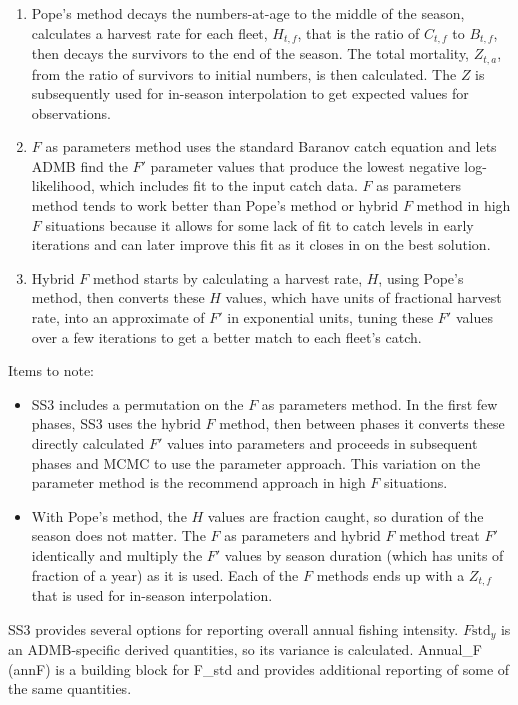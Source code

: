 \begin{enumerate}
	\item Pope's method decays the numbers-at-age to the middle of the season, calculates a harvest rate for each fleet, $H_{t,f}$, that is the ratio of $C_{t,f}$ to $B_{t,f}$, then decays the survivors to the end of the season. The total mortality, $Z_{t,a}$, from the ratio of survivors to initial numbers, is then calculated. The $Z$ is subsequently used for in-season interpolation to get expected values for observations.
	
	\item $F$ as parameters method uses the standard Baranov catch equation and lets ADMB find the $F'$ parameter values that produce the lowest negative log-likelihood, which includes fit to the input catch data. $F$ as parameters method tends to work better than Pope's method or hybrid $F$ method in high $F$ situations because it allows for some lack of fit to catch levels in early iterations and can later improve this fit as it closes in on the best solution.
	
	\item Hybrid $F$ method starts by calculating a harvest rate, $H$, using Pope's method, then converts these $H$ values, which have units of fractional harvest rate, into an approximate of $F'$ in exponential units, tuning these $F'$ values over a few iterations to get a better match to each fleet's catch.
\end{enumerate}

Items to note:
\begin{itemize}
	\item SS3 includes a permutation on the $F$ as parameters method. In the first few phases, SS3 uses the hybrid $F$ method, then between phases it converts these directly calculated $F'$ values into parameters and proceeds in subsequent phases and MCMC to use the parameter approach. This variation on the parameter method is the recommend approach in high $F$ situations.
	
	\item With Pope's method, the $H$ values are fraction caught, so duration of the season does not matter. The $F$ as parameters and hybrid $F$ method treat $F'$ identically and multiply the $F'$ values by season duration (which has units of fraction of a year) as it is used. Each of the $F$ methods ends up with a $Z_{t,f}$ that is used for in-season interpolation.
\end{itemize}

SS3 provides several options for reporting overall annual fishing intensity. $F\text{std}_y$ is an ADMB-specific derived quantities, so its variance is calculated. Annual\_F (annF) is a building block for F\_std and provides additional reporting of some of the same quantities.

